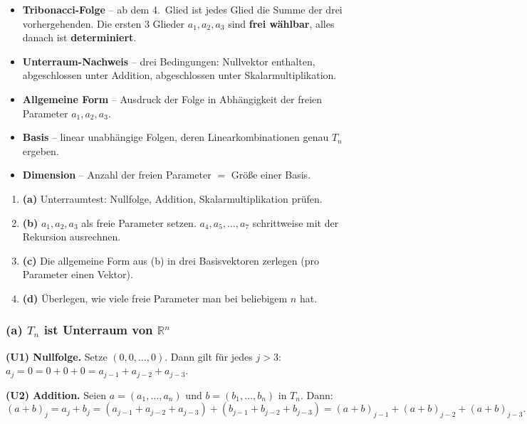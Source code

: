\documentclass[a4paper,12pt]{article}
\begin{document}
\begin{begriffe}
\begin{itemize}[leftmargin=*, nosep]
    \item \textbf{Tribonacci-Folge} -- ab dem 4.\ Glied ist jedes Glied die Summe der drei vorhergehenden. Die ersten 3 Glieder $a_1, a_2, a_3$ sind \textbf{frei w\"ahlbar}, alles danach ist \textbf{determiniert}.
    \item \textbf{Unterraum-Nachweis} -- drei Bedingungen: Nullvektor enthalten, abgeschlossen unter Addition, abgeschlossen unter Skalarmultiplikation.
    \item \textbf{Allgemeine Form} -- Ausdruck der Folge in Abh\"angigkeit der freien Parameter $a_1, a_2, a_3$.
    \item \textbf{Basis} -- linear unabh\"angige Folgen, deren Linearkombinationen genau $T_n$ ergeben.
    \item \textbf{Dimension} -- Anzahl der freien Parameter $=$ Gr\"o\ss e einer Basis.
\end{itemize}
\end{begriffe}

\begin{wastun}
\begin{enumerate}[leftmargin=*, nosep]
    \item \textbf{(a)} Unterraumtest: Nullfolge, Addition, Skalarmultiplikation pr\"ufen.
    \item \textbf{(b)} $a_1, a_2, a_3$ als freie Parameter setzen. $a_4, a_5, \dots, a_7$ schrittweise mit der Rekursion ausrechnen.
    \item \textbf{(c)} Die allgemeine Form aus (b) in drei Basisvektoren zerlegen (pro Parameter einen Vektor).
    \item \textbf{(d)} \"Uberlegen, wie viele freie Parameter man bei beliebigem $n$ hat.
\end{enumerate}
\end{wastun}

\subsubsection*{(a) $T_n$ ist Unterraum von $\mathbb{R}^n$}

\textbf{(U1) Nullfolge.} Setze $(0, 0, \dots, 0)$. Dann gilt f\"ur jedes $j > 3$: $a_j = 0 = 0 + 0 + 0 = a_{j-1} + a_{j-2} + a_{j-3}$. \checkmark

\textbf{(U2) Addition.} Seien $a = (a_1, \dots, a_n)$ und $b = (b_1, \dots, b_n)$ in $T_n$. Dann:
\[
(a+b)_j = a_j + b_j = (a_{j-1} + a_{j-2} + a_{j-3}) + (b_{j-1} + b_{j-2} + b_{j-3}) = (a+b)_{j-1} + (a+b)_{j-2} + (a+b)_{j-3}.
\]
\checkmark
\end{document}

